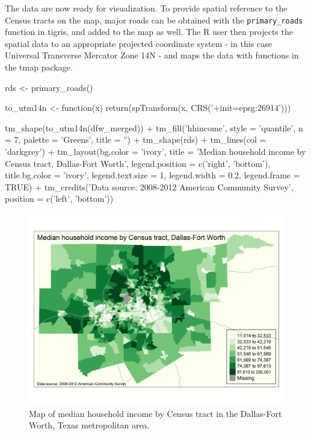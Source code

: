 The data are now ready for visualization. To provide spatial reference
to the Census tracts on the map, major roads can be obtained with the
\texttt{primary\_roads} function in tigris, and added to the map as
well. The R user then projects the spatial data to an appropriate
projected coordinate system - in this case Universal Transverse Mercator
Zone 14N - and maps the data with functions in the tmap package.

\begin{Schunk}
\begin{Sinput}
rds <- primary_roads()

to_utm14n <- function(x) {
  return(spTransform(x, CRS('+init=epsg:26914')))
} 

tm_shape(to_utm14n(dfw_merged)) + 
  tm_fill('hhincome', style = 'quantile', n = 7, palette = 'Greens', title = '') + 
tm_shape(rds) + 
  tm_lines(col = 'darkgrey') + 
tm_layout(bg.color = 'ivory', title = 'Median household income by Census tract, Dallas-Fort Worth', 
          legend.position = c('right', 'bottom'), title.bg.color = 'ivory', legend.text.size = 1, 
          legend.width = 0.2, legend.frame = TRUE) + 
tm_credits('Data source: 2008-2012 American Community Survey', 
           position = c('left', 'bottom'))
\end{Sinput}
\end{Schunk}

\begin{figure}[htbp]
  \centering
  \includegraphics[width=\textwidth]{income_map}
  \caption{Map of median household income by Census tract in the Dallas-Fort Worth, Texas metropolitan area.}
  \label{figure:income_map}
\end{figure}

